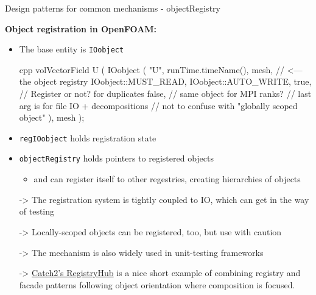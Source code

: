 \begin{frame}{Design patterns for common mechanisms - objectRegistry}

{\bf Object registration in OpenFOAM:}

\begin{itemize}
    \item The base entity is {\tt IOobject}
\begin{CodeEnvNoComment}[]{cpp}{\scriptsize}
volVectorField U (
    IOobject (
        "U",
        runTime.timeName(),
        mesh, // <--- the object registry
        IOobject::MUST_READ,
        IOobject::AUTO_WRITE,
        true, // Register or not? for duplicates
        false, // same object for MPI ranks?
        // last arg is for file IO + decompositions
        // not to confuse with "globally scoped object"
    ),
    mesh
);
\end{CodeEnvNoComment}
    \item {\tt regIOobject} holds registration state 
    \item {\tt objectRegistry} holds pointers to registered objects
        \begin{itemize}
            \item and can register itself to other regestries, creating hierarchies of objects
        \end{itemize}
    \item[->] The registration system is tightly coupled to IO, which can get in the way of testing
    \item[->] Locally-scoped objects can be registered, too, but use with caution
\end{itemize}

\begin{itemize}
    \item[->] The mechanism is also widely used in unit-testing frameworks
    \item[->] \href{https://github.com/catchorg/Catch2/blob/53ddf37af4488cac7724761858ae3cca9d2d65e7/src/catch2/interfaces/catch\_interfaces\_registry\_hub.hpp\#L34}{Catch2's RegistryHub}
        is a nice short example of combining registry and facade patterns following
        object orientation where composition is focused.
\end{itemize}

\end{frame}
